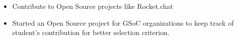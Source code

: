 
  \begin{itemize}
  \item Contribute to Open Source projects like Rocket.chat
  \item Started an Open Source project for GSoC organizations to keep track of student's contribution for better selection criterion.
  \end{itemize}